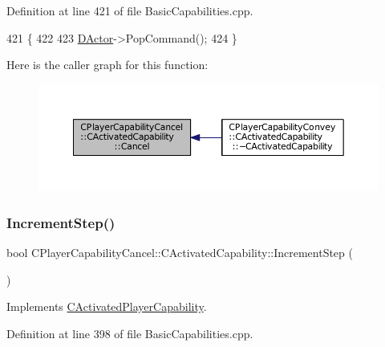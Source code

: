 Definition at line 421 of file Basic\+Capabilities.\+cpp.


\begin{DoxyCode}
421                                                         \{
422 
423     \hyperlink{classCActivatedPlayerCapability_a54ca944b47bff2718330639941d402b0}{DActor}->PopCommand();
424 \}
\end{DoxyCode}
Here is the caller graph for this function\+:\nopagebreak
\begin{figure}[H]
\begin{center}
\leavevmode
\includegraphics[width=350pt]{classCPlayerCapabilityCancel_1_1CActivatedCapability_accd67b449574b6c99e21f522d13bc96a_icgraph}
\end{center}
\end{figure}
\hypertarget{classCPlayerCapabilityCancel_1_1CActivatedCapability_a28351293b3a662bca20a2d666b8801e1}{}\label{classCPlayerCapabilityCancel_1_1CActivatedCapability_a28351293b3a662bca20a2d666b8801e1} 
\subsubsection{\texorpdfstring{Increment\+Step()}{IncrementStep()}}
{\footnotesize\ttfamily bool C\+Player\+Capability\+Cancel\+::\+C\+Activated\+Capability\+::\+Increment\+Step (\begin{DoxyParamCaption}{ }\end{DoxyParamCaption})\hspace{0.3cm}{\ttfamily [virtual]}}



Implements \hyperlink{classCActivatedPlayerCapability_a943b5999a57504399293250382c0ec6a}{C\+Activated\+Player\+Capability}.



Definition at line 398 of file Basic\+Capabilities.\+cpp.


